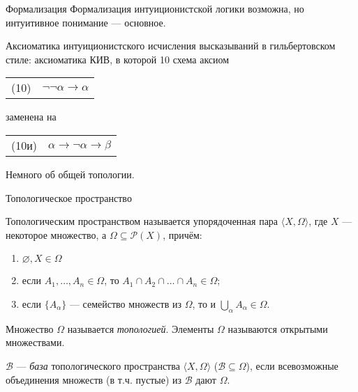 \documentclass[aspectratio=169]{beamer}
\begin{document}
\begin{frame}{Формализация}
Формализация интуиционистской логики возможна, но интуитивное понимание --- основное.

\begin{defrus}Аксиоматика интуиционистского исчисления высказываний в гильбертовском стиле: 
аксиоматика КИВ, в которой 10 схема аксиом

\begin{center}\begin{tabular}{ll}
(10) & $\neg \neg \alpha \rightarrow \alpha$
\end{tabular}\end{center}

заменена на 

\begin{center}\begin{tabular}{ll}
(10и) & $\alpha \rightarrow \neg\alpha \rightarrow \beta$
\end{tabular}\end{center}
\end{defrus}
\end{frame}

\begin{frame}{}
\begin{center}\Large Немного об общей топологии.\end{center}
\end{frame}


\begin{frame}{Топологическое пространство}

\begin{defrus}Топологическим пространством называется упорядоченная пара $\langle X, \Omega \rangle$,
где $X$ --- некоторое множество, а $\Omega \subseteq \mathcal{P}(X)$, причём:
\begin{enumerate}
\item $\varnothing, X \in \Omega$
\item если $A_1, \dots, A_n \in \Omega$, то $A_1 \cap A_2 \cap \dots \cap A_n \in \Omega$;
\item если $\{A_\alpha\}$ --- семейство множеств из $\Omega$, то и $\bigcup_\alpha A_\alpha \in \Omega$.
\end{enumerate}

Множество $\Omega$ называется \emph{топологией}.
Элементы $\Omega$ называются открытыми множествами.
\end{defrus}


\begin{defrus}$\mathcal{B}$ --- \emph{база} топологического пространства $\langle X, \Omega\rangle$ ($\mathcal{B} \subseteq \Omega$), 
если всевозможные объединения множеств (в т.ч. пустые) из $\mathcal{B}$ дают $\Omega$.
\end{defrus}
\end{frame}
\end{document}
